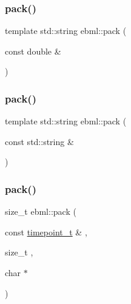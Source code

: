 \mbox{\label{namespaceebml_a71bb6ebad794abe2b04f2d24036636cd}} 
\subsubsection{\texorpdfstring{pack()}{pack()}\hspace{0.1cm}{\footnotesize\ttfamily [17/24]}}
{\footnotesize\ttfamily template std\+::string ebml\+::pack (\begin{DoxyParamCaption}\item[{const double \&}]{ }\end{DoxyParamCaption})}

\mbox{\label{namespaceebml_a12db4cd27f116243759ded7e321b0a45}} 
\subsubsection{\texorpdfstring{pack()}{pack()}\hspace{0.1cm}{\footnotesize\ttfamily [18/24]}}
{\footnotesize\ttfamily template std\+::string ebml\+::pack (\begin{DoxyParamCaption}\item[{const std\+::string \&}]{ }\end{DoxyParamCaption})}

\mbox{\label{namespaceebml_a1878818f2cc11ea62ecab6513bc7e9d1}} 
\subsubsection{\texorpdfstring{pack()}{pack()}\hspace{0.1cm}{\footnotesize\ttfamily [19/24]}}
{\footnotesize\ttfamily size\+\_\+t ebml\+::pack (\begin{DoxyParamCaption}\item[{const \mbox{\hyperlink{namespaceebml_a7e667ec3fe8b51fb5b8f9690734d8638}{timepoint\+\_\+t}} \&}]{,  }\item[{size\+\_\+t}]{,  }\item[{char $\ast$}]{ }\end{DoxyParamCaption})}

\mbox{\label{namespaceebml_a0292a5a59fc28b1537dcf2d1e2c9cf2d}} 
